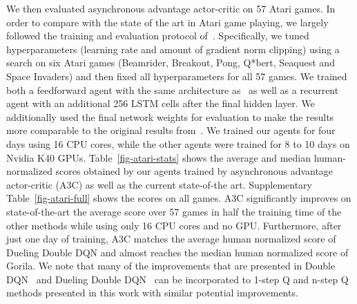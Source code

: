 \documentclass{article} %
\begin{document}
We then evaluated asynchronous advantage actor-critic on 57 Atari games.
In order to compare with the state of the art in Atari game playing, we largely followed the training
and evaluation protocol of~\cite{hado2015doubledqn}.
Specifically, we tuned hyperparameters (learning rate and amount of gradient norm clipping) using a search on six Atari games (Beamrider, Breakout, Pong, Q*bert, Seaquest and Space Invaders) and then fixed all hyperparameters for all 57 games.
We trained both a feedforward agent with the same architecture as~\citep{mnih-dqn-2015,nair2015gorila,hado2015doubledqn} as well as a recurrent agent with an additional 256 LSTM cells after the final hidden layer.
We additionally used the final network weights for evaluation to make the results more comparable to the original results from~\cite{bellemare-ale}.
We trained our agents for four days using 16 CPU cores, while the other agents were trained for 8 to 10 days on Nvidia K40 GPUs.
Table~\ref{fig-atari-stats} shows the average and median human-normalized scores obtained by our agents trained by asynchronous advantage actor-critic (A3C) as well as
the current state-of-the art. Supplementary Table~\ref{fig-atari-full} shows the scores on all games.
A3C significantly improves on state-of-the-art the average score over 57 games
in half the training time of the other methods while using only 16 CPU cores and no GPU.
Furthermore, after just one day of training, A3C matches the average human normalized score of Dueling Double DQN and almost reaches the median human normalized score of Gorila. We note that many of the improvements that are presented in Double DQN~\citep{hado2015doubledqn} and Dueling Double DQN~\citep{wang2015dueling} can be incorporated to 1-step Q and n-step Q methods presented in this work with similar potential improvements.
\end{document}
